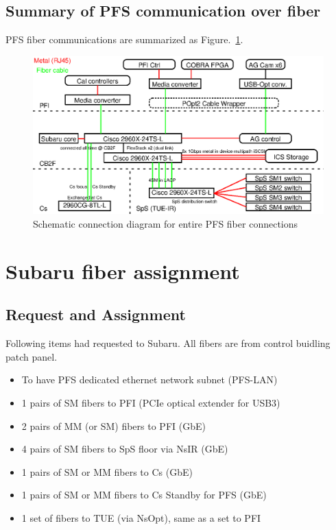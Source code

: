 \documentclass[a4paper,notitlepage]{article}
\begin{document}
\subsection{Summary of PFS communication over fiber}

PFS fiber communications are summarized as Figure.~\ref{fig:fiber-connection}. 

\begin{figure}[htb]
  \begin{center}
    \includegraphics{networks-list.eps}
  \end{center}
  \caption{Schematic connection diagram for entire PFS fiber connections}
  \label{fig:fiber-connection}
\end{figure}


\section{Subaru fiber assignment}

\subsection{Request and Assignment}

Following items had requested to Subaru. 
All fibers are from control buidling patch panel. 

\begin{itemize}
  \item To have PFS dedicated ethernet network subnet (PFS-LAN)
  \item 1 pairs of SM fibers to PFI (PCIe optical extender for USB3)
  \item 2 pairs of MM (or SM) fibers to PFI (GbE)
  \item 4 pairs of SM fibers to SpS floor via NsIR (GbE)
  \item 1 pairs of SM or MM fibers to Cs (GbE)
  \item 1 pairs of SM or MM fibers to Cs Standby for PFS (GbE)
  \item 1 set of fibers to TUE (via NsOpt), same as a set to PFI
\end{itemize}
\end{document}
